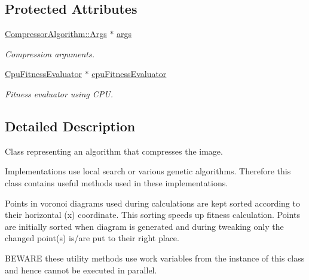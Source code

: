 \subsection*{Protected Attributes}
\begin{DoxyCompactItemize}
\item 
\hyperlink{structlossycompressor_1_1_compressor_algorithm_1_1_args}{Compressor\+Algorithm\+::\+Args} $\ast$ \hyperlink{classlossycompressor_1_1_compressor_algorithm_a7cec23bc2a41ac35617e21466a2f0c46}{args}\hypertarget{classlossycompressor_1_1_compressor_algorithm_a7cec23bc2a41ac35617e21466a2f0c46}{}\label{classlossycompressor_1_1_compressor_algorithm_a7cec23bc2a41ac35617e21466a2f0c46}

\begin{DoxyCompactList}\small\item\em Compression arguments. \end{DoxyCompactList}\item 
\hyperlink{classlossycompressor_1_1_cpu_fitness_evaluator}{Cpu\+Fitness\+Evaluator} $\ast$ \hyperlink{classlossycompressor_1_1_compressor_algorithm_a23c2407260dfc34b4cb74dcf270aaae1}{cpu\+Fitness\+Evaluator}\hypertarget{classlossycompressor_1_1_compressor_algorithm_a23c2407260dfc34b4cb74dcf270aaae1}{}\label{classlossycompressor_1_1_compressor_algorithm_a23c2407260dfc34b4cb74dcf270aaae1}

\begin{DoxyCompactList}\small\item\em Fitness evaluator using C\+PU. \end{DoxyCompactList}\end{DoxyCompactItemize}


\subsection{Detailed Description}
Class representing an algorithm that compresses the image. 

Implementations use local search or various genetic algorithms. Therefore this class contains useful methods used in these implementations.

Points in voronoi diagrams used during calculations are kept sorted according to their horizontal (x) coordinate. This sorting speeds up fitness calculation. Points are initially sorted when diagram is generated and during tweaking only the changed point(s) is/are put to their right place.

B\+E\+W\+A\+RE these utility methods use work variables from the instance of this class and hence cannot be executed in parallel. 

